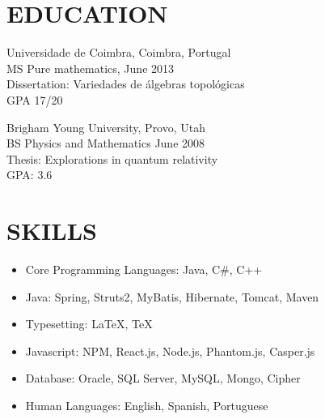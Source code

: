 \documentclass[11pt]{res} %
\begin{document}
\begin{resume}
\section{EDUCATION} 
 \noindent Universidade de Coimbra, Coimbra, Portugal \\
MS Pure mathematics, June 2013 \\
Dissertation: Variedades de álgebras topológicas \\
GPA 17/20

\noindent Brigham Young University, Provo, Utah\\
BS Physics and Mathematics June 2008\\
Thesis: Explorations in quantum relativity\\
GPA: 3.6 

\section{SKILLS}
\begin{itemize}
\item Core Programming Languages: Java, C\#, C++
\item Java: Spring, Struts2, MyBatis, Hibernate, Tomcat, Maven
\item Typesetting: \LaTeX, \TeX
\item Javascript: NPM, React.js, Node.js, Phantom.js, Casper.js
\item Database: Oracle, SQL Server, MySQL, Mongo, Cipher
\item Human Languages: English, Spanish, Portuguese

\end{itemize}

\end{resume}
\end{document}
